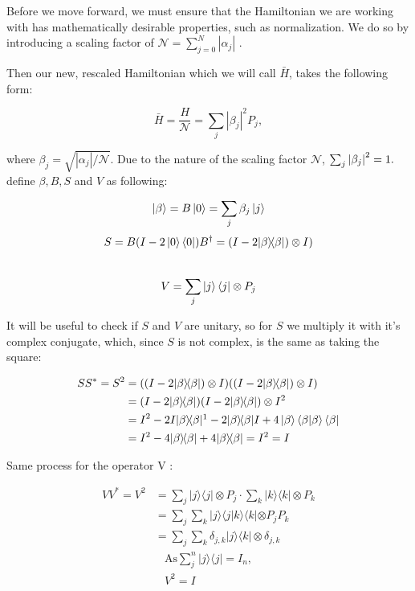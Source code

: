 \documentclass{article}
\def\bracket#1#2{\langle #1 | #2 \rangle}
\def\kb#1#2{| #1 \rangle\!\langle #2 |}
\def\kbtwo#1#2#3#4{|#1 \rangle\!\langle #2 | #3 \rangle\!\langle #4 | }
\begin{document}
Before we move forward, we must ensure that the Hamiltonian we are working with has mathematically desirable properties, such as normalization. We do so by introducing a scaling factor of $\mathcal{N} = \sum_{j=0}^N |\alpha_j|$ \cite{poulin}.

Then our new, rescaled Hamiltonian which we will call $\bar{H}$, takes the following form:

\begin{equation}
	\bar H = \frac H{\mathcal{N}} = \sum_j|\beta_j|^2 P_j,
\end{equation}

where $\beta_j = \sqrt{|\alpha_j|/\mathcal{N}}$. Due to the nature of the scaling factor $\mathcal{N}$, $\sum_j \abs{\beta_j}^2 = 1.$
\\\textcite{poulin} define $\beta, B, S$ and  $V$ as following:

$$
\left\vert{\beta}\right\rangle = B\left\vert{0}\right\rangle = \sum_j \beta_j \left\vert{j}\right\rangle$$
$$
S = B (I - 2 \ket{0}\bra{0}) B^{\dagger}= (I-2\kb \beta \beta) \otimes I)$$
\\
$$
V=\sum_{j}\left\vert{j}\right\rangle\left\langle{j}\right\vert \otimes P_{j}
$$

It will be useful to check if $S$ and $V$ are unitary, so for $S$ we multiply it with it's complex conjugate, which, since $S$ is not complex, is the same as taking the square:

\begin{align*}
SS^* = S^2 &= ((I-2\kb \beta \beta) \otimes I)((I-2\kb \beta \beta) \otimes I)\\
&= (I-2\kb \beta \beta)(I-2\kb \beta \beta) \otimes I^2 \\
&= I^2 - 2I\kb \beta \beta\footnotemark - 2\kb \beta \beta I + 4 \ket{\beta} \bracket \beta \beta \bra \beta\\
&= I^2 - 4\kb \beta \beta + 4\kb \beta \beta = I^2 = I
\end{align*}



Same process for the operator $ $V :

\begin{align*}
VV^* = V^2 &= \sum_{j} \kb jj \otimes P_{j} \cdot \sum_{k} \kb kk \otimes P_{k} \\
&= \sum_j \sum_k \kbtwo j j k k \otimes P_j P_k\\
&= \sum_j \sum_k \delta_{j,k} | j \rangle \langle k | \otimes \delta_{j,k}
\end{align*}
\begin{gather*}
\text{As}  \sum_{j}^{n} \kb jj = I_n, \\
V^2 = I
\end{gather*}
\end{document}
